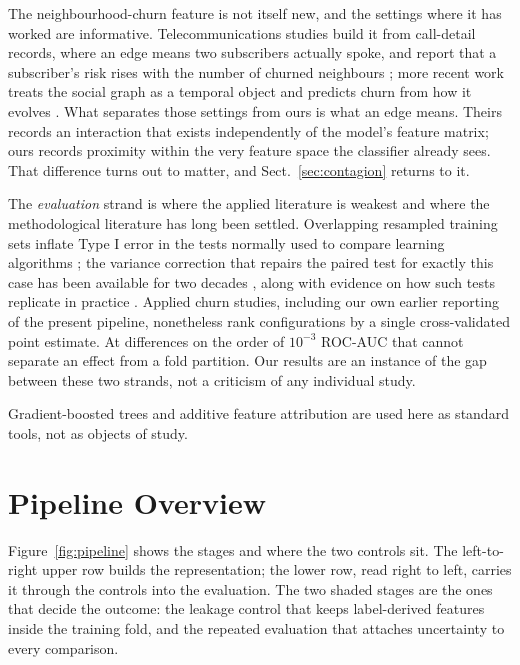 \documentclass[runningheads]{llncs}
\begin{document}
The neighbourhood-churn feature is not itself new, and the settings where it has
worked are informative. Telecommunications studies build it from call-detail
records, where an edge means two subscribers actually spoke, and report that a
subscriber's risk rises with the number of churned neighbours
\cite{kostic2020socialnetwork}; more recent work treats the social graph as a
temporal object and predicts churn from how it evolves
\cite{lee2025tempodegraphnet}. What separates those settings from ours is what an
edge means. Theirs records an interaction that exists independently of the
model's feature matrix; ours records proximity within the very feature space the
classifier already sees. That difference turns out to matter, and
Sect.~\ref{sec:contagion} returns to it.

The \emph{evaluation} strand is where the applied literature is weakest and where
the methodological literature has long been settled. Overlapping resampled
training sets inflate Type I error in the tests normally used to compare learning
algorithms \cite{dietterich1998approximate}; the variance correction that repairs
the paired test for exactly this case has been available for two decades
\cite{nadeau2003inference}, along with evidence on how such tests replicate in
practice \cite{bouckaert2004replicability,demsar2006statistical}. Applied churn
studies, including our own earlier reporting of the present pipeline,
nonetheless rank configurations by a single cross-validated point estimate. At
differences on the order of $10^{-3}$ ROC-AUC that cannot separate an effect from
a fold partition. Our results are an instance of the gap between these two
strands, not a criticism of any individual study.

Gradient-boosted trees \cite{chen2016xgboost,ke2017lightgbm} and additive feature
attribution \cite{lundberg2017shap} are used here as standard tools, not as
objects of study.

\section{Pipeline Overview}

Figure~\ref{fig:pipeline} shows the stages and where the two controls sit. The
left-to-right upper row builds the representation; the lower row, read right to
left, carries it through the controls into the evaluation. The two shaded stages
are the ones that decide the outcome: the leakage control that keeps
label-derived features inside the training fold, and the repeated evaluation
that attaches uncertainty to every comparison.
\end{document}
